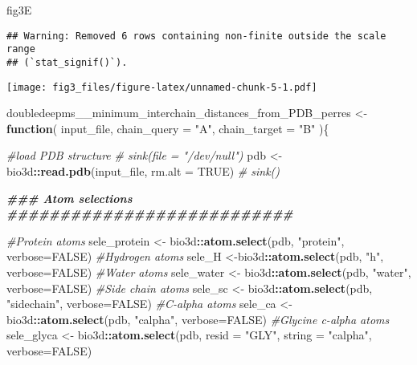 \documentclass[
]{article}
\newenvironment{Shaded}{\begin{snugshade}}{\end{snugshade}}
\newcommand{\AttributeTok}[1]{\textcolor[rgb]{0.13,0.29,0.53}{#1}}
\newcommand{\CommentTok}[1]{\textcolor[rgb]{0.56,0.35,0.01}{\textit{#1}}}
\newcommand{\ConstantTok}[1]{\textcolor[rgb]{0.56,0.35,0.01}{#1}}
\newcommand{\ControlFlowTok}[1]{\textcolor[rgb]{0.13,0.29,0.53}{\textbf{#1}}}
\newcommand{\DocumentationTok}[1]{\textcolor[rgb]{0.56,0.35,0.01}{\textbf{\textit{#1}}}}
\newcommand{\FunctionTok}[1]{\textcolor[rgb]{0.13,0.29,0.53}{\textbf{#1}}}
\newcommand{\NormalTok}[1]{#1}
\newcommand{\OtherTok}[1]{\textcolor[rgb]{0.56,0.35,0.01}{#1}}
\newcommand{\SpecialCharTok}[1]{\textcolor[rgb]{0.81,0.36,0.00}{\textbf{#1}}}
\newcommand{\StringTok}[1]{\textcolor[rgb]{0.31,0.60,0.02}{#1}}
\begin{document}
\begin{Shaded}
\begin{Highlighting}[]
\NormalTok{fig3E}
\end{Highlighting}
\end{Shaded}

\begin{verbatim}
## Warning: Removed 6 rows containing non-finite outside the scale range
## (`stat_signif()`).
\end{verbatim}

\texttt{[image: fig3\_files/figure-latex/unnamed-chunk-5-1.pdf]}

\begin{Shaded}
\begin{Highlighting}[]
\NormalTok{doubledeepms\_\_minimum\_interchain\_distances\_from\_PDB\_perres }\OtherTok{\textless{}{-}} \ControlFlowTok{function}\NormalTok{(}
\NormalTok{    input\_file,}
  \AttributeTok{chain\_query =} \StringTok{"A"}\NormalTok{,}
  \AttributeTok{chain\_target =} \StringTok{"B"}
\NormalTok{  )\{}
  
  \CommentTok{\#load PDB structure}
\CommentTok{\#   sink(file = "/dev/null")}
\NormalTok{  pdb }\OtherTok{\textless{}{-}}\NormalTok{ bio3d}\SpecialCharTok{::}\FunctionTok{read.pdb}\NormalTok{(input\_file, }\AttributeTok{rm.alt =} \ConstantTok{TRUE}\NormalTok{)}
\CommentTok{\#   sink()}

  \DocumentationTok{\#\#\# Atom selections}
  \DocumentationTok{\#\#\#\#\#\#\#\#\#\#\#\#\#\#\#\#\#\#\#\#\#\#\#\#\#\#\#}

    \CommentTok{\#Protein atoms}
\NormalTok{  sele\_protein }\OtherTok{\textless{}{-}}\NormalTok{ bio3d}\SpecialCharTok{::}\FunctionTok{atom.select}\NormalTok{(pdb, }\StringTok{"protein"}\NormalTok{, }\AttributeTok{verbose=}\ConstantTok{FALSE}\NormalTok{)}
    \CommentTok{\#Hydrogen atoms}
\NormalTok{  sele\_H }\OtherTok{\textless{}{-}}\NormalTok{bio3d}\SpecialCharTok{::}\FunctionTok{atom.select}\NormalTok{(pdb, }\StringTok{"h"}\NormalTok{, }\AttributeTok{verbose=}\ConstantTok{FALSE}\NormalTok{)}
    \CommentTok{\#Water atoms}
\NormalTok{  sele\_water }\OtherTok{\textless{}{-}}\NormalTok{ bio3d}\SpecialCharTok{::}\FunctionTok{atom.select}\NormalTok{(pdb, }\StringTok{"water"}\NormalTok{, }\AttributeTok{verbose=}\ConstantTok{FALSE}\NormalTok{)}
    \CommentTok{\#Side chain atoms}
\NormalTok{  sele\_sc }\OtherTok{\textless{}{-}}\NormalTok{ bio3d}\SpecialCharTok{::}\FunctionTok{atom.select}\NormalTok{(pdb, }\StringTok{"sidechain"}\NormalTok{, }\AttributeTok{verbose=}\ConstantTok{FALSE}\NormalTok{)}
    \CommentTok{\#C{-}alpha atoms}
\NormalTok{  sele\_ca }\OtherTok{\textless{}{-}}\NormalTok{ bio3d}\SpecialCharTok{::}\FunctionTok{atom.select}\NormalTok{(pdb, }\StringTok{"calpha"}\NormalTok{, }\AttributeTok{verbose=}\ConstantTok{FALSE}\NormalTok{)}
    \CommentTok{\#Glycine c{-}alpha atoms}
\NormalTok{  sele\_glyca }\OtherTok{\textless{}{-}}\NormalTok{ bio3d}\SpecialCharTok{::}\FunctionTok{atom.select}\NormalTok{(pdb, }\AttributeTok{resid =} \StringTok{"GLY"}\NormalTok{, }\AttributeTok{string =} \StringTok{"calpha"}\NormalTok{, }\AttributeTok{verbose=}\ConstantTok{FALSE}\NormalTok{)}


\end{Highlighting}
\end{Shaded}
\end{document}
